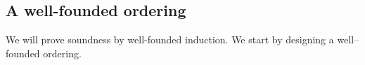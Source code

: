 


\subsection{A well-founded ordering}
\label{sect:prove:wellfounded}

We will prove soundness by well-founded induction.
We start by designing a well--founded ordering. 




